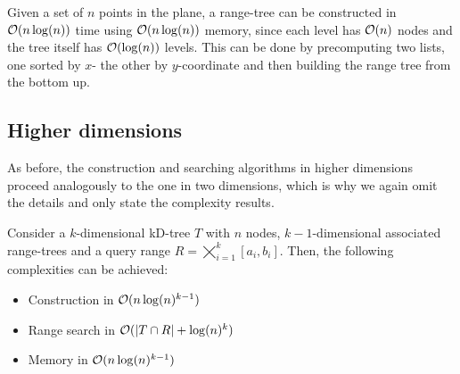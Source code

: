         \begin{remark} 
            Given a set of $n$ points in the plane, a range-tree can be constructed in $\mathcal{O}(n\log(n))$ time using $\mathcal{O}(n\log(n))$ memory, since each level has $\mathcal{O}(n)$ nodes and the tree itself has $\mathcal{O}(\log(n))$ levels. This can be done by precomputing two lists, one sorted by $x$- the other by $y$-coordinate and then building the range tree from the bottom up. 
        \end{remark}

    \subsection{Higher dimensions}
        As before, the construction and searching algorithms in higher dimensions proceed analogously to the one in two dimensions, which is why we again omit the details and only state the complexity results.

        \begin{proposition}
            Consider a $k$-dimensional kD-tree $T$ with $n$ nodes, $k-1$-dimensional associated range-trees and a query range $R = \bigtimes_{i = 1}^{k} [a_i, b_i]$. Then, the following complexities can be achieved:
            \begin{itemize}[itemsep=-3pt]
                \item Construction in $\mathcal{O}(n\log(n)^{k-1})$
                \item Range search in $\mathcal{O}(\vert T \cap R \vert + \log(n)^k)$
                \item Memory in $\mathcal{O}(n\log(n)^{k-1})$
            \end{itemize}
        \end{proposition}